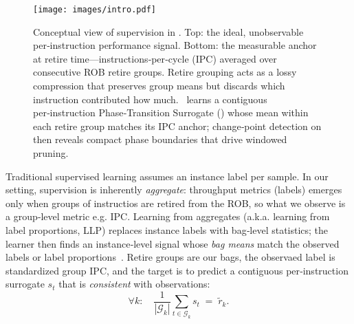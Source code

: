 \begin{figure}[!htbp]
    \centering
    \setlength{\belowcaptionskip}{-10pt}
    \captionsetup{skip=0pt}
    \captionsetup[subfigure]{font=footnotesize, skip=1pt}
    \texttt{[image: images/intro.pdf]}
    \caption{Conceptual view of supervision in \name. Top: the ideal, unobservable per‑instruction performance signal. Bottom: the measurable anchor at retire time—instructions‑per‑cycle (IPC) averaged over consecutive ROB retire groups. Retire grouping acts as a lossy compression that preserves group means but discards which instruction contributed how much. \name\ learns a contiguous per‑instruction Phase‑Transition Surrogate (\pts) whose mean within each retire group matches its IPC anchor; change‑point detection on \pts then reveals compact phase boundaries that drive windowed pruning.}
 
    \label{fig:conceptual}
\end{figure}
Traditional supervised learning assumes an instance label per sample. In our setting, supervision is inherently \emph{aggregate}:  throughput metrics (labels) emerges only when groups of instructios are retired from the ROB, so what we observe is a group‑level metric e.g. IPC. Learning from aggregates (a.k.a. learning from label proportions, LLP) replaces instance labels with bag‑level statistics; the learner then finds an instance‑level signal whose \emph{bag means} match the observed labels or label proportions~\cite{yu2014-llp,scott2020-llp,law2018-agg,zhang2020-agg}. Retire groups are our bags, the observaed label is standardized group IPC, and the target is to predict a contiguous per‑instruction surrogate \(s_t\) that is \emph{consistent} with observations:
$$
\forall k:\quad \frac{1}{|\mathcal{G}_k|}\sum_{t\in \mathcal{G}_k} s_t \;=\; \tilde{r}_k.
$$

